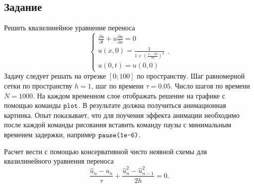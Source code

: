 \chapter{}

\section{Задание}
Решить квазилинейное уравнение переноса
\begin{equation} \label{c8eq1}
	\begin{cases}
		\displaystyle \frac{\partial u}{\partial t} + u \frac{\partial u}{\partial x} = 0 \\
		\displaystyle u(x,0) = \frac{1}{1 + \left( \displaystyle \frac{x-50}{10} \right)^4} \\
		u(0,t) = u(0,0) 
	\end{cases}.
\end{equation}
Задачу следует решать на отрезке $[0; 100]$ по пространству. Шаг равномерной сетки по пространству $h = 1$, шаг по времени $\tau = 0.05$. Число шагов по времени $N = 1000$. На каждом временном слое отображать решение на графике с помощью команды $\texttt{\lstinline|plot|}$. В результате должна получиться анимационная картинка. Опыт показывает, что для поучения эффекта анимации необходимо после каждой команды рисования вставить команду паузы с минимальным временем задержки, например $\texttt{\lstinline|pause(1e-6)|}$.

Расчет вести с помощью консервативной чисто неявной схемы для квазилинейного уравнения переноса
\begin{equation} \label{c8eq2}
	\frac{\hat{u}_n - u_n}{\tau} + \frac{\hat{u}^2_n - \hat{u}^2_{n-1}}{2h} = 0.	
\end{equation}


